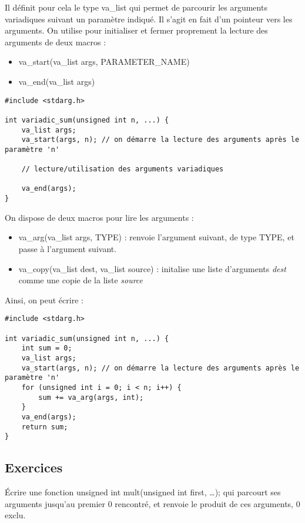 \documentclass[../../../main.tex]{subfiles}
\begin{document}
Il définit pour cela le type \textsf{va\_list} qui permet de parcourir les arguments variadiques suivant un paramètre indiqué. Il s'agit en fait d'un pointeur vers les arguments. On utilise pour initialiser et fermer proprement la lecture des arguments de deux macros :
\begin{itemize}
	\item \textsf{va\_start(va\_list args, PARAMETER\_NAME)}
	\item \textsf{va\_end(va\_list args)}
\end{itemize}
\begin{verbatim}
#include <stdarg.h>

int variadic_sum(unsigned int n, ...) {
	va_list args;
	va_start(args, n); // on démarre la lecture des arguments après le paramètre 'n'

	// lecture/utilisation des arguments variadiques

	va_end(args);
}
\end{verbatim}
On dispose de deux macros pour lire les arguments :
\begin{itemize}
	\item \textsf{va\_arg(va\_list args, TYPE)} : renvoie l'argument suivant, de type \textsf{TYPE}, et passe à l'argument suivant. 
	\item \textsf{va\_copy(va\_list dest, va\_list source)} : initalise une liste d'arguments \textit{dest} comme une copie de la liste \textit{source}
\end{itemize}
Ainsi, on peut écrire :
\begin{verbatim}
#include <stdarg.h>

int variadic_sum(unsigned int n, ...) {
	int sum = 0;
	va_list args;
	va_start(args, n); // on démarre la lecture des arguments après le paramètre 'n'
	for (unsigned int i = 0; i < n; i++) {
		sum += va_arg(args, int);
	}
	va_end(args);
	return sum;
}
\end{verbatim}
\subsection{Exercices}
 Écrire une fonction \textsf{unsigned int mult(unsigned int first, \dots);} qui parcourt ses arguments jusqu'au premier 0 rencontré, et renvoie le produit de ces arguments, 0 exclu.
\end{document}
